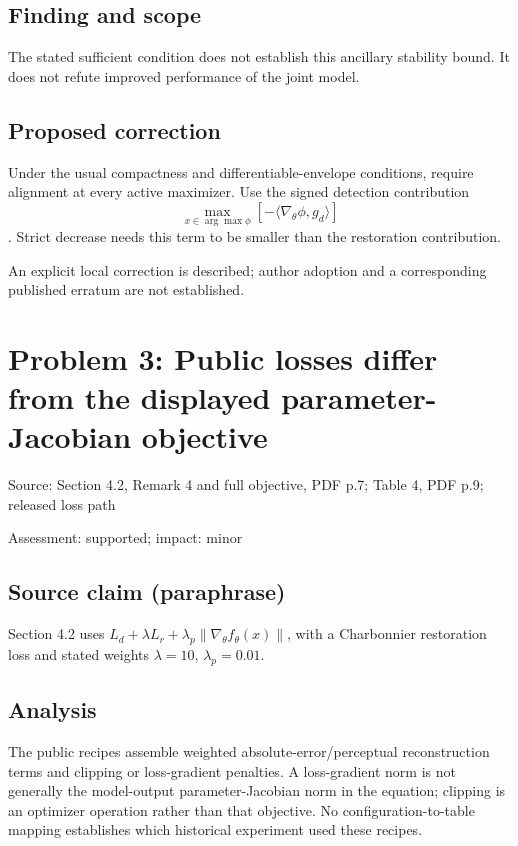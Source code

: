 \documentclass[11pt]{article}
\begin{document}
\subsection*{Finding and scope}

The stated sufficient condition does not establish this ancillary stability bound. It does not refute improved performance of the joint model.

\subsection*{Proposed correction}

Under the usual compactness and differentiable-envelope conditions, require alignment at every active maximizer. Use the signed detection contribution \[\max_{x\in\arg\max\phi}[-\langle\nabla_\theta\phi,g_d\rangle]\]. Strict decrease needs this term to be smaller than the restoration contribution.

An explicit local correction is described; author adoption and a corresponding published erratum are not established.

\section*{Problem 3: Public losses differ from the displayed parameter-Jacobian objective}

Source: Section 4.2, Remark 4 and full objective, PDF p.7; Table 4, PDF p.9; released loss path

Assessment: supported; impact: minor

\subsection*{Source claim (paraphrase)}

Section 4.2 uses \(L_d+\lambda L_r+\lambda_p\|\nabla_\theta f_\theta(x)\|\), with a Charbonnier restoration loss and stated weights \(\lambda=10\), \(\lambda_p=0.01\).

\subsection*{Analysis}

The public recipes assemble weighted absolute-error/perceptual reconstruction terms and clipping or loss-gradient penalties. A loss-gradient norm is not generally the model-output parameter-Jacobian norm in the equation; clipping is an optimizer operation rather than that objective. No configuration-to-table mapping establishes which historical experiment used these recipes.
\end{document}

